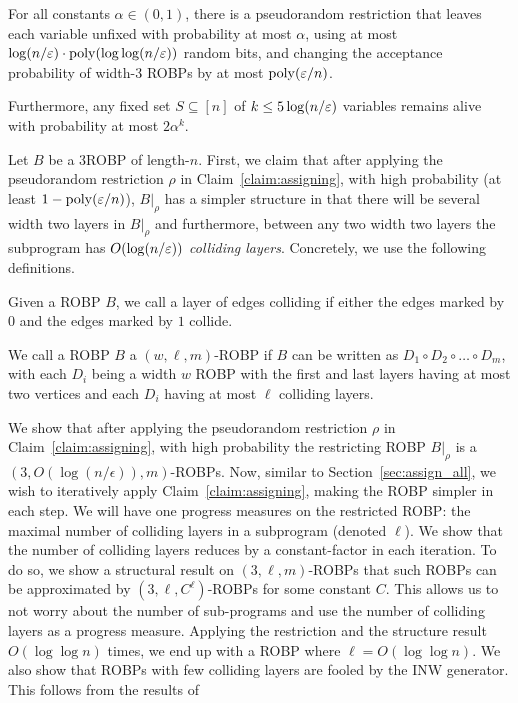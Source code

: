 \begin{claim}\label{claim:assigning}
For all constants $\alpha \in (0,1)$, there is a pseudorandom restriction that leaves each variable unfixed with probability at most $\alpha$, using at most $\log(n/\varepsilon) \cdot {\mathrm{poly}}(\log\log(n/\varepsilon))$ random bits, and changing the acceptance probability of width-3 ROBPs by at most ${\mathrm{poly}}(\varepsilon/n)$.

Furthermore, any fixed set $S\subseteq[n]$ of  $k \le 5\log(n/\varepsilon)$ variables remains alive with probability at most $2 \alpha^k$.\end{claim}

Let $B$ be a 3ROBP of length-$n$. First, we claim that after applying the pseudorandom restriction $\rho$ in Claim~\ref{claim:assigning}, with high probability (at least $1-{\mathrm{poly}}(\varepsilon/n)$), $B|_{\rho}$ has a simpler structure in that there will be several width two layers in $B|_{\rho}$ and furthermore, between any two width two layers the subprogram has $O(\log(n/\varepsilon))$ \emph{colliding layers}. Concretely, we use the following definitions. 

\begin{definition}
Given a ROBP $B$, we call a layer of edges {\sf colliding} if either the edges marked by $0$ and the edges marked by $1$ collide.

We call a ROBP $B$ a $(w, \ell,m)$-ROBP if $B$ can be written as $D_1 \circ D_2 \circ \ldots \circ D_m$, with each $D_i$ being a width $w$ ROBP with the first and last layers having at most two vertices and each $D_i$ having at most $\ell$ colliding layers.
\end{definition}

We show that after applying the pseudorandom restriction $\rho$ in Claim~\ref{claim:assigning}, with high probability the restricting ROBP $B|_\rho$ is a $(3,O(\log(n/\epsilon)),m)$-ROBPs. Now, similar to Section~\ref{sec:assign_all}, we wish to iteratively apply Claim~\ref{claim:assigning}, making the ROBP simpler in each step. We will have one progress measures on the restricted ROBP: the maximal number of colliding layers in a subprogram (denoted $\ell$). We show that the number of colliding layers reduces by a constant-factor in each iteration. To do so, we show a structural result on $(3,\ell,m)$-ROBPs that such ROBPs can be approximated by $(3,\ell, C^\ell)$-ROBPs for some constant $C$. This allows us to not worry about the number of sub-programs and use the number of colliding layers as a progress measure. Applying the restriction and the structure result $O(\log\log n)$ times, we end up with a ROBP where $\ell = O(\log \log n)$. We also show that ROBPs with few colliding layers are fooled by the INW generator. This follows from the results of \cite{BravermanRRY10}


